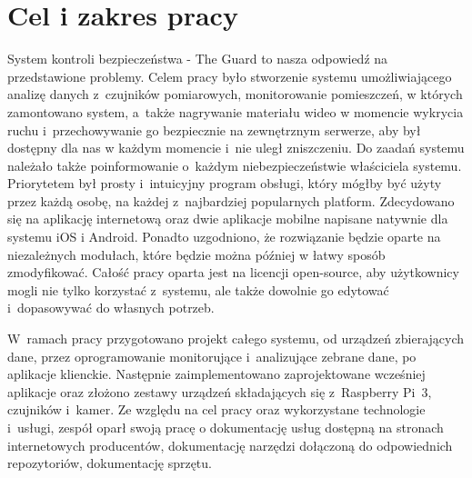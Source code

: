 \documentclass[polish,bachelor,a4paper,oneside]{ppfcmthesis}
\begin{document}
    \section{Cel i zakres pracy}
    System kontroli bezpieczeństwa - The Guard to nasza odpowiedź na przedstawione problemy. Celem pracy było stworzenie systemu umożliwiającego analizę danych z~czujników pomiarowych, monitorowanie pomieszczeń, w których zamontowano system, a~także nagrywanie materiału wideo w momencie wykrycia ruchu i~przechowywanie go bezpiecznie na zewnętrznym serwerze, aby był dostępny dla nas w każdym momencie i~nie uległ zniszczeniu. Do zaadań systemu należało także poinformowanie o~każdym niebezpieczeństwie właściciela systemu. Priorytetem był prosty i~intuicyjny program obsługi, który mógłby być użyty przez każdą osobę, na każdej z~najbardziej popularnych platform. Zdecydowano się na aplikację internetową oraz dwie aplikacje mobilne napisane natywnie dla systemu iOS i Android. Ponadto uzgodniono, że rozwiązanie będzie oparte na niezależnych modułach, które będzie można później w łatwy sposób zmodyfikować. Całość pracy oparta jest na licencji open-source, aby użytkownicy mogli nie tylko korzystać z~systemu, ale także dowolnie go edytować i~dopasowywać do własnych potrzeb.

    W~ramach pracy przygotowano projekt całego systemu, od urządzeń zbierających dane, przez oprogramowanie monitorujące i~analizujące zebrane dane, po aplikacje klienckie. Następnie zaimplementowano zaprojektowane wcześniej aplikacje oraz złożono zestawy urządzeń składających się z~Raspberry Pi~3, czujników i~kamer.
    Ze względu na cel pracy oraz wykorzystane technologie i~usługi, zespół oparł swoją pracę o dokumentację usług dostępną na stronach internetowych producentów, dokumentację narzędzi dołączoną do odpowiednich repozytoriów, dokumentację sprzętu.
\end{document}
